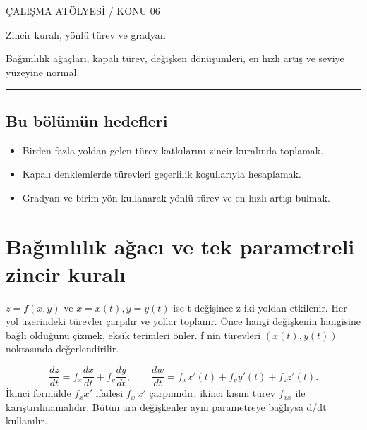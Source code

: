 
{\sffamily\small\color{accent} ÇALIŞMA ATÖLYESİ / KONU 06\par}
\vspace{8mm}
{\Huge\sffamily\bfseries\raggedright{} Zincir kuralı, yönlü türev ve gradyan\par}
\vspace{3mm}
{\large Bağımlılık ağaçları, kapalı türev, değişken dönüşümleri, en hızlı artış ve seviye yüzeyine normal.\par}
\vspace{4mm}\hrule\vspace{4mm}\subsection*{Bu bölümün hedefleri}\begin{itemize}
\item Birden fazla yoldan gelen türev katkılarını zincir kuralında toplamak.
\item Kapalı denklemlerde türevleri geçerlilik koşullarıyla hesaplamak.
\item Gradyan ve birim yön kullanarak yönlü türev ve en hızlı artışı bulmak.\end{itemize}
{\small\tableofcontents}\clearpage
\section{Bağımlılık ağacı ve tek parametreli zincir kuralı}
\(z=f(x,y)\) ve \(x=x(t),y=y(t)\) ise t değişince z iki yoldan etkilenir. Her yol üzerindeki türevler çarpılır ve yollar toplanır. Önce hangi değişkenin hangisine bağlı olduğunu çizmek, eksik terimleri önler. f nin türevleri \((x(t),y(t))\) noktasında değerlendirilir.


{\small\[
\frac{dz}{dt}=f_x\frac{dx}{dt}+f_y\frac{dy}{dt},\qquad\frac{dw}{dt}=f_xx\prime(t)+f_yy\prime(t)+f_zz\prime(t).
\]}
İkinci formülde \(f_xx\prime\) ifadesi \(f_x\,x\prime\) çarpımıdır; ikinci kısmi türev \(f_{xx}\) ile karıştırılmamalıdır. Bütün ara değişkenler aynı parametreye bağlıysa d/dt kullanılır.

